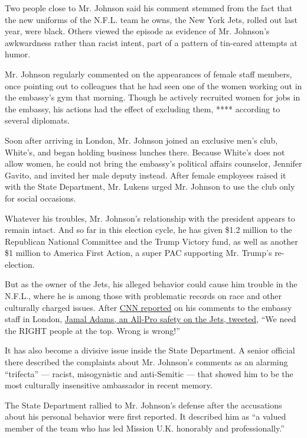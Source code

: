 Two people close to Mr. Johnson said his comment stemmed from the fact
that the new uniforms of the N.F.L. team he owns, the New York Jets,
rolled out last year, were black. Others viewed the episode as evidence
of Mr. Johnson's awkwardness rather than racist intent, part of a
pattern of tin-eared attempts at humor.

Mr. Johnson regularly commented on the appearances of female staff
members, once pointing out to colleagues that he had seen one of the
women working out in the embassy's gym that morning. Though he actively
recruited women for jobs in the embassy, his actions had the effect of
excluding them, **** according to several diplomats.

Soon after arriving in London, Mr. Johnson joined an exclusive men's
club, White's, and began holding business lunches there. Because White's
does not allow women, he could not bring the embassy's political affairs
counselor, Jennifer Gavito, and invited her male deputy instead. After
female employees raised it with the State Department, Mr. Lukens urged
Mr. Johnson to use the club only for social occasions.

Whatever his troubles, Mr. Johnson's relationship with the president
appears to remain intact. And so far in this election cycle, he has
given \$1.2 million to the Republican National Committee and the Trump
Victory fund, as well as another \$1 million to America First Action, a
super PAC supporting Mr. Trump's re-election.

But as the owner of the Jets, his alleged behavior could cause him
trouble in the N.F.L., where he is among those with problematic records
on race and other culturally charged issues. After
\href{https://www.cnn.com/2020/07/22/politics/woody-johnson-oig-report/index.html}{CNN
reported} on his comments to the embassy staff in London,
\href{https://twitter.com/Prez/status/1285983250628767744?s=20}{Jamal
Adams, an All-Pro safety on the Jets, tweeted}, ``We need the RIGHT
people at the top. Wrong is wrong!''

It has also become a divisive issue inside the State Department. A
senior official there described the complaints about Mr. Johnson's
comments as an alarming ``trifecta'' --- racist, misogynistic and
anti-Semitic --- that showed him to be the most culturally insensitive
ambassador in recent memory.

The State Department rallied to Mr. Johnson's defense after the
accusations about his personal behavior were first reported. It
described him as ``a valued member of the team who has led Mission U.K.
honorably and professionally.''

